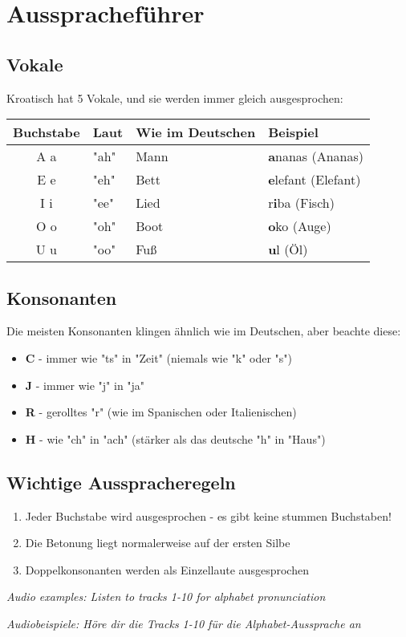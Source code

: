 \section{Ausspracheführer}

\begin{grammar}
\subsection*{Vokale}

Kroatisch hat 5 Vokale, und sie werden immer gleich ausgesprochen:

\begin{center}
\begin{tabular}{clll}
\toprule
Buchstabe & Laut & Wie im Deutschen & Beispiel \\
\midrule
A a & "ah" & Mann & \textbf{a}nanas (Ananas) \\
E e & "eh" & Bett & \textbf{e}lefant (Elefant) \\
I i & "ee" & Lied & r\textbf{i}ba (Fisch) \\
O o & "oh" & Boot & \textbf{o}ko (Auge) \\
U u & "oo" & Fuß & \textbf{u}l (Öl) \\
\bottomrule
\end{tabular}
\end{center}

\subsection*{Konsonanten}

Die meisten Konsonanten klingen ähnlich wie im Deutschen, aber beachte diese:

\begin{itemize}
    \item \textbf{C} - immer wie "ts" in "Zeit" (niemals wie "k" oder "s")
    \item \textbf{J} - immer wie "j" in "ja"
    \item \textbf{R} - gerolltes "r" (wie im Spanischen oder Italienischen)
    \item \textbf{H} - wie "ch" in "ach" (stärker als das deutsche "h" in "Haus")
\end{itemize}

\subsection*{Wichtige Ausspracheregeln}

\begin{enumerate}
    \item Jeder Buchstabe wird ausgesprochen - es gibt keine stummen Buchstaben!
    \item Die Betonung liegt normalerweise auf der ersten Silbe
    \item Doppelkonsonanten werden als Einzellaute ausgesprochen
\end{enumerate}

\textit{Audio examples: Listen to tracks 1-10 for alphabet pronunciation}

\textit{Audiobeispiele: Höre dir die Tracks 1-10 für die Alphabet-Aussprache an}
\end{grammar}

